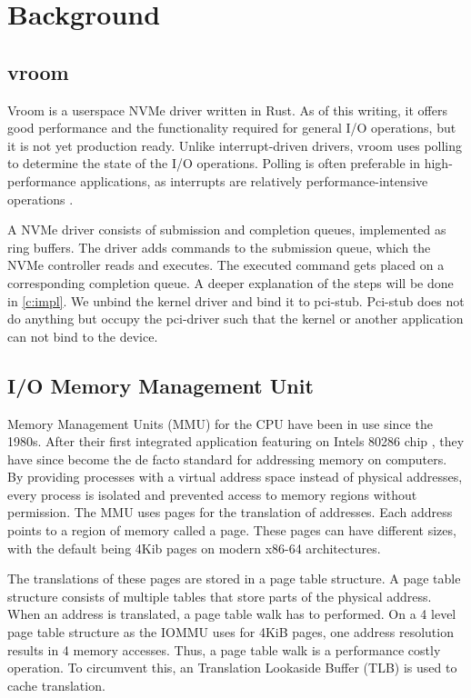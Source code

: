 \chapter{Background}

\section{vroom}
Vroom is a userspace NVMe driver written in Rust. As of this writing, it offers good performance and the functionality required for general I/O operations, but it is not yet production ready. Unlike interrupt-driven drivers, vroom uses polling to determine the state of the I/O operations. Polling is often preferable in high-performance applications, as interrupts are relatively performance-intensive operations \cite{spdksubmitting}.

A NVMe driver consists of submission and completion queues, implemented as ring buffers. The driver adds commands to the submission queue, which the NVMe controller reads and executes. The executed command gets placed on a corresponding completion queue. A deeper explanation of the steps will be done in \autoref{c:impl}.
We unbind the kernel driver and bind it to pci-stub. Pci-stub does not do anything but occupy the pci-driver such that the kernel or another application can not bind to the device.

\section{I/O Memory Management Unit}
Memory Management Units (MMU) for the CPU have been in use since the 1980s. After their first integrated application featuring on Intels 80286 chip \cite{intel80286}, they have since become the de facto standard for addressing memory on computers. By providing processes with a virtual address space instead of physical addresses, every process is isolated and prevented access to memory regions without permission. The MMU uses pages for the translation of addresses. Each address points to a region of memory called a page. These pages can have different sizes, with the default being 4Kib pages on modern x86-64 architectures.

The translations of these pages are stored in a page table structure. A page table structure consists of multiple tables that store parts of the physical address. When an address is translated, a page table walk has to performed. On a 4 level page table structure as the IOMMU uses for 4KiB pages, one address resolution results in 4 memory accesses. Thus, a page table walk is a performance costly operation. To circumvent this, an Translation Lookaside Buffer (TLB) is used to cache translation.

